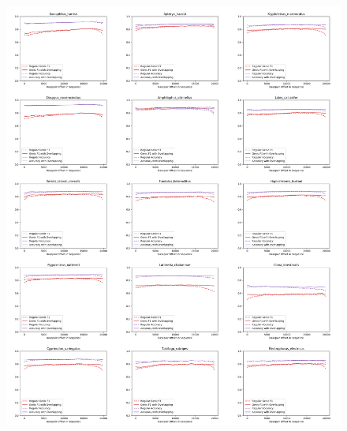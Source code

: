 \documentclass{article}
\begin{document}
\begin{figure}[!h]
\centerline{\includegraphics[width=\overlapscale\textwidth]{images/overlapping/montage_animals11}}
\end{figure}
\end{document}
